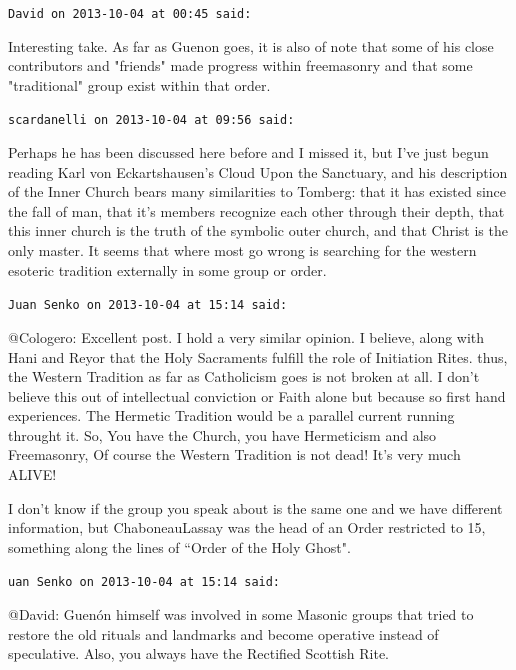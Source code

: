 \begin{footnotesize}\begin{sffamily}



\texttt{David on 2013-10-04 at 00:45 said: }

Interesting take. As far as Guenon goes, it is also of note that some of his close contributors and "friends" made progress within freemasonry and that some "traditional" group exist within that order.


\hfill

\texttt{scardanelli on 2013-10-04 at 09:56 said: }

Perhaps he has been discussed here before and I missed it, but I've just begun reading Karl von Eckartshausen's Cloud Upon the Sanctuary, and his description of the Inner Church bears many similarities to Tomberg: that it has existed since the fall of man, that it's members recognize each other through their depth, that this inner church is the truth of the symbolic outer church, and that Christ is the only master. It seems that where most go wrong is searching for the western esoteric tradition externally in some group or order.


\hfill

\texttt{Juan Senko on 2013-10-04 at 15:14 said: }

@Cologero: Excellent post. I hold a very similar opinion. I believe, along with Hani and Reyor that the Holy Sacraments fulfill the role of Initiation Rites. thus, the Western Tradition as far as Catholicism goes is not broken at all. I don't believe this out of intellectual conviction or Faith alone but because so first hand experiences. The Hermetic Tradition would be a parallel current running throught it. So, You have the Church, you have Hermeticism and also Freemasonry, Of course the Western Tradition is not dead! It's very much ALIVE!

I don't know if the group you speak about is the same one and we have different information, but ChaboneauLassay was the head of an Order restricted to 15, something along the lines of ``Order of the Holy Ghost".


\hfill

\texttt{uan Senko on 2013-10-04 at 15:14 said: }

@David: Guenón himself was involved in some Masonic groups that tried to restore the old rituals and landmarks and become operative instead of speculative. Also, you always have the Rectified Scottish Rite.


\end{sffamily}
\end{footnotesize}
